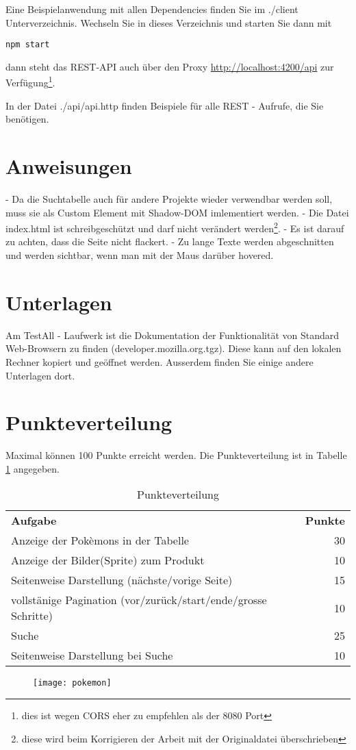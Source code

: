\documentclass[a4paper, 11pt]{article}
\begin{document}
Eine Beispielanwendung mit allen Dependencies finden Sie im ./client Unterverzeichnis.
Wechseln Sie in dieses Verzeichnis und starten Sie dann mit
\begin{verbatim}
npm start
\end{verbatim}

dann steht das REST-API auch über den Proxy 
\href{http://localhost:4200/api}{http://localhost:4200/api} zur Verfügung\footnote{dies ist wegen CORS eher zu empfehlen als der 8080 Port}.

In der Datei ./api/api.http finden Beispiele für alle REST - Aufrufe, die Sie benötigen. 
\section{Anweisungen}

- Da die Suchtabelle auch für andere Projekte wieder verwendbar werden soll, muss sie als Custom Element mit Shadow-DOM imlementiert werden.
- Die Datei index.html ist schreibgeschützt und darf nicht verändert werden\footnote{diese wird beim Korrigieren der Arbeit mit der Originaldatei überschrieben}.
- Es ist darauf zu achten, dass die Seite nicht flackert. 
- Zu lange Texte werden abgeschnitten und werden sichtbar, wenn man mit der Maus darüber hovered.
\section{Unterlagen}

Am TestAll - Laufwerk ist die Dokumentation der Funktionalität von Standard Web-Browsern zu finden (developer.mozilla.org.tgz).
Diese kann auf den lokalen Rechner kopiert und geöffnet werden. Ausserdem finden Sie einige andere Unterlagen dort.

\section{Punkteverteilung}
Maximal können 100 Punkte erreicht werden. Die Punkteverteilung ist in Tabelle \ref{tab:points} angegeben.
\begin{table}[ht]
\centering
\caption{Punkteverteilung}

\begin{tabular}{| l | r |} \cline{1-2} 
\textbf{Aufgabe} &  \textbf{Punkte}  \\ \cline{1-2}
Anzeige der Pokèmons in der Tabelle & 30 \\ \cline{1-2}
Anzeige der Bilder(Sprite) zum Produkt & 10 \\ \cline{1-2}
Seitenweise Darstellung (nächste/vorige Seite) & 15 \\ \cline{1-2}
vollstänige Pagination (vor/zurück/start/ende/grosse Schritte)& 10\\ \cline{1-2}
Suche & 25\\ \cline{1-2}
Seitenweise Darstellung bei Suche & 10\\ \cline{1-2}
\end{tabular}
\label{tab:points}
\end{table}

\begin{figure}
	\center
	\texttt{[image: pokemon]}
	\label{fig:img}
\end{figure}
\end{document}
